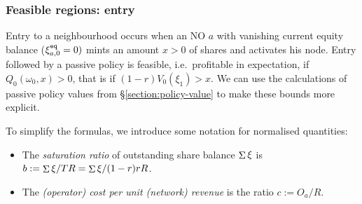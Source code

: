 \subsubsection{Feasible regions: entry}
\label{section:entry}
%
Entry to a neighbourhood occurs when an NO $a$ with vanishing current equity balance ($\xi^{\mathtt{eq}}_{a,0}=0)$ mints an amount $x>0$ of shares and activates his node.
%
Entry followed by a passive policy is feasible, i.e.~profitable in expectation, if $Q_0(\omega_0,x)>0$, that is if $(1-r)V_0(\xi_1) > x$.
%
We can use the calculations of passive policy values from \S\ref{section:policy-value} to make these bounds more explicit.

To simplify the formulas, we introduce some notation for normalised quantities:
%
\begin{itemize}
  \item The \emph{saturation ratio} of outstanding share balance $\mathop{\Sigma}\xi$ is $b:=\mathop{\Sigma}\xi/TR = \mathop{\Sigma}\xi/(1-r)rR$.
  \item The \emph{(operator) cost per unit (network) revenue} is the ratio $c:=O_a/R$.
\end{itemize}

